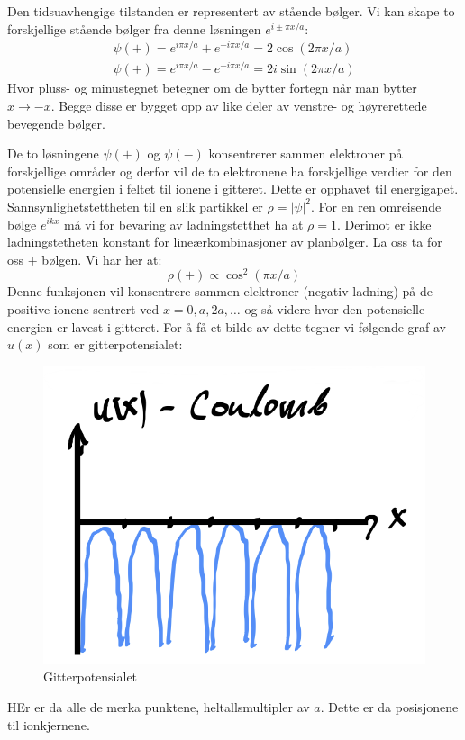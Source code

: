 \documentclass{article}
\begin{document}
Den tidsuavhengige tilstanden er representert av stående bølger. Vi kan skape to forskjellige stående bølger fra denne løsningen $e^{i \pm \pi x /a}$:
\begin{align}
    \psi(+) = e^{i \pi x / a} + e^{-i \pi x / a} = 2 \cos(2\pi x /a)\\
    \psi(+) = e^{i \pi x / a} - e^{-i \pi x / a} = 2i \sin(2\pi x /a)
\end{align}
Hvor pluss- og minustegnet betegner om de bytter fortegn når man bytter $x \rightarrow -x$. Begge disse er bygget opp av like deler av venstre- og høyrerettede bevegende bølger.

De to løsningene $\psi(+)$ og $\psi(-)$ konsentrerer sammen elektroner på forskjellige områder og derfor vil de to elektronene ha forskjellige verdier for den potensielle energien i feltet til ionene i gitteret. Dette er opphavet til energigapet. Sannsynlighetstettheten til en slik partikkel er $\rho = |\psi|^2$. For en ren omreisende bølge $e^{ikx}$ må vi for bevaring av ladningstetthet ha at $\rho = 1$. Derimot er ikke ladningstetheten konstant for lineærkombinasjoner av planbølger. La oss ta for oss $+$ bølgen. Vi har her at:
\begin{equation}
    \rho(+) \propto \cos^2(\pi x / a)
\end{equation}
Denne funksjonen vil konsentrere sammen elektroner (negativ ladning) på de positive ionene sentrert ved $x = 0, a, 2a, \dots$ og så videre hvor den potensielle energien er lavest i gitteret. For å få et bilde av dette tegner vi følgende graf av $u(x)$ som er gitterpotensialet:
\begin{figure}[H]
    \centering
    \includegraphics[width=0.5\linewidth]{bilder/gitterpotensialet_nestenfrimodell.png}
    \caption{Gitterpotensialet}
    \label{fig:gitterpotensialet_nestenfrimodell}
\end{figure}
HEr er da alle de merka punktene, heltallsmultipler av $a$. Dette er da posisjonene til ionkjernene.
\end{document}
